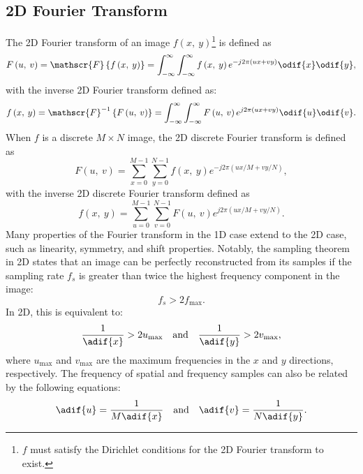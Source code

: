 \documentclass{article}
\begin{document}
\subsection{2D Fourier Transform}
The 2D Fourier transform of an image \(f\left( x,\: y
\right)\)\footnote{\(f\) must satisfy the Dirichlet conditions for the
2D Fourier transform to exist.} is defined as
\begin{equation*}
    F\left( u,\: v \right) = \mathscr{F}\left\{ f\left( x,\: y \right) \right\} = \int_{-\infty}^{\infty} \int_{-\infty}^{\infty} f\left( x,\: y \right) e^{-j2\pi\left( ux + vy \right)} \odif{x} \odif{y},
\end{equation*}
with the inverse 2D Fourier transform defined as:
\begin{equation*}
    f\left( x,\: y \right) = \mathscr{F}^{-1}\left\{ F\left( u,\: v \right) \right\} = \int_{-\infty}^{\infty} \int_{-\infty}^{\infty} F\left( u,\: v \right) e^{j2\pi\left( ux + vy \right)} \odif{u} \odif{v}.
\end{equation*}
When \(f\) is a discrete \(M \times N\) image, the 2D discrete Fourier
transform is defined as
\begin{equation*}
    F\left( u,\: v \right) = \sum_{x = 0}^{M-1} \sum_{y = 0}^{N-1} f\left( x,\: y \right) e^{-j2\pi\left( ux/M + vy/N \right)},
\end{equation*}
with the inverse 2D discrete Fourier transform defined as
\begin{equation*}
    f\left( x,\: y \right) = \sum_{u = 0}^{M-1} \sum_{v = 0}^{N-1} F\left( u,\: v \right) e^{j2\pi\left( ux/M + vy/N \right)}.
\end{equation*}
Many properties of the Fourier transform in the 1D case extend to the 2D
case, such as linearity, symmetry, and shift properties. Notably, the
sampling theorem in 2D states that an image can be perfectly
reconstructed from its samples if the sampling rate \(f_s\) is greater
than twice the highest frequency component in the image:
\begin{equation*}
    f_s > 2f_{\text{max}}.
\end{equation*}
In 2D, this is equivalent to:
\begin{equation*}
    \frac{1}{\adif{x}} > 2 u_{\text{max}} \quad \text{and} \quad \frac{1}{\adif{y}} > 2 v_{\text{max}},
\end{equation*}
where \(u_{\text{max}}\) and \(v_{\text{max}}\) are the maximum
frequencies in the \(x\) and \(y\) directions, respectively. The
frequency of spatial and frequency samples can also be related by the
following equations:
\begin{equation*}
    \adif{u} = \frac{1}{M\adif{x}} \quad \text{and} \quad \adif{v} = \frac{1}{N\adif{y}}.
\end{equation*}
\end{document}
